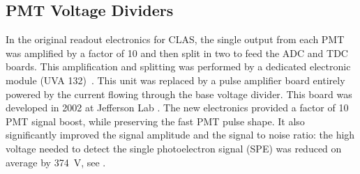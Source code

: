 \subsection{PMT Voltage Dividers}

In the original readout electronics for CLAS, the single output from each PMT was amplified by a factor of 10 and then
split in two to feed the ADC and TDC boards. This amplification and splitting was performed by a dedicated electronic
module (UVA 132)~\cite{Adams:2001kk}. This unit was replaced by a pulse amplifier board entirely powered by the
current flowing through the base voltage divider. This board was developed in 2002 at Jefferson Lab
\cite{Popov:2003mj}. The new electronics provided a factor of 10 PMT signal boost, while preserving the fast PMT
pulse shape. It also significantly improved the signal amplitude and the signal to noise ratio: the high voltage needed
to detect the single photoelectron signal (SPE) was reduced on average by 374~V, see .

